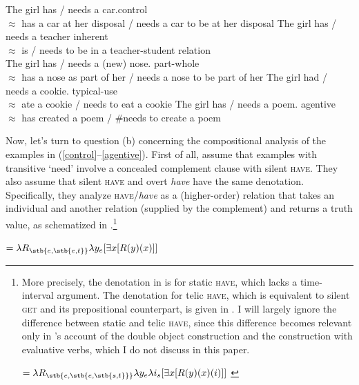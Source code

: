 \documentclass[output=paper]{langscibook}
\begin{document}
\ea \label{have-R}
\ea The girl has / needs a car.\hfill control\label{control}\\
$\approx$ has a car at her disposal / needs a car to be at her disposal
\ex The girl has / needs a teacher  \hfill inherent \label{inherent}\\
$\approx$ is / needs to be in a teacher-student relation\\
\ex The girl has / needs a (new) nose. \hfill part-whole\label{part-whole}\\
$\approx$ has a nose as part of her / needs a nose to be part of her
\ex The girl had / needs a cookie. \hfill typical-use\\
$\approx$ ate a cookie / needs to eat a cookie\label{typical-use}
\ex The girl has / needs a poem. \hfill agentive \label{agentive}\\
$\approx$ has created a poem / \#needs to create a poem
\z\z

\noindent Now, let's turn to question (b) concerning the compositional analysis of the examples in (\ref{control}--\ref{agentive}). First of all, \citet{Zaroukian.Beller2013} assume that examples with transitive `need' involve a concealed complement clause with silent \textsc{have}. They also assume that silent \textsc{have} and overt \textit{have} have the same denotation. Specifically, they analyze \textsc{have}/\textit{have} as a (higher-order) relation that takes an individual and another relation (supplied by the complement) and returns a truth value, as schematized in .\footnote{More precisely, the denotation in  is for static \textsc{have}, which lacks a time-interval argument. The denotation for telic \textsc{have}, which is equivalent to  silent \textsc{get} and its prepositional counterpart, is given in . I will largely ignore the difference between static and telic \textsc{have}, since this difference becomes relevant only in \citeauthor{Zaroukian.Beller2013}'s account of the double object construction and the construction with evaluative verbs, which I do not discuss in this paper.

\ea\label{have-telic-formula}
 $= \lambda R_{\stb{e,\stb{e,\stb{s,t}}}} \lambda y_e \lambda i_s [\exists x [R(y)(x)(i)]]$ \hfill \citep[648]{Zaroukian.Beller2013}
\z
}

\ea\label{have-formula}
 $= \lambda R_{\stb{e,\stb{e,t}}} \lambda y_e [\exists x [R(y)(x)]]$ \hfill \citep[649]{Zaroukian.Beller2013}
\z
\end{document}
